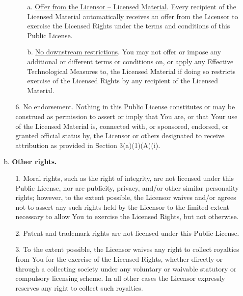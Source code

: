 \begin{enumerate}
\begin{enumerate}
\begin{enumerate}
			\item[a.] \underline{Offer from the Licensor -- Licensed Material}.
			Every recipient of the Licensed Material automatically
			receives an offer from the Licensor to exercise the
			Licensed Rights under the terms and conditions of this
			Public License.

			\item[b.] \underline{No downstream restrictions}. You may not offer
			or impose any additional or different terms or conditions on, or
			apply any Effective Technological Measures to, the
			Licensed Material if doing so restricts exercise of the
			Licensed Rights by any recipient of the Licensed
			Material.

		\end{enumerate}

		\item[6.] \underline{No endorsement}. Nothing in this Public License
		constitutes or may be construed as permission to assert or imply that
		You are, or that Your use of the Licensed Material is, connected
		with, or sponsored, endorsed, or granted official status by,
		the Licensor or others designated to receive attribution as
		provided in Section 3(a)(1)(A)(i).

	\end{enumerate}

	\item[b.] \textbf{Other rights.}

	\begin{enumerate}

		\item[1.] Moral rights, such as the right of integrity, are not
		licensed under this Public License, nor are publicity,
		privacy, and/or other similar personality rights; however, to
		the extent possible, the Licensor waives and/or agrees not to
		assert any such rights held by the Licensor to the limited
		extent necessary to allow You to exercise the Licensed
		Rights, but not otherwise.

		\item[2.] Patent and trademark rights are not licensed under this
		Public License.

		\item[3.] To the extent possible, the Licensor waives any right to
		collect royalties from You for the exercise of the Licensed
		Rights, whether directly or through a collecting society
		under any voluntary or waivable statutory or compulsory
		licensing scheme. In all other cases the Licensor expressly
		reserves any right to collect such royalties.

	\end{enumerate}

\end{enumerate}


